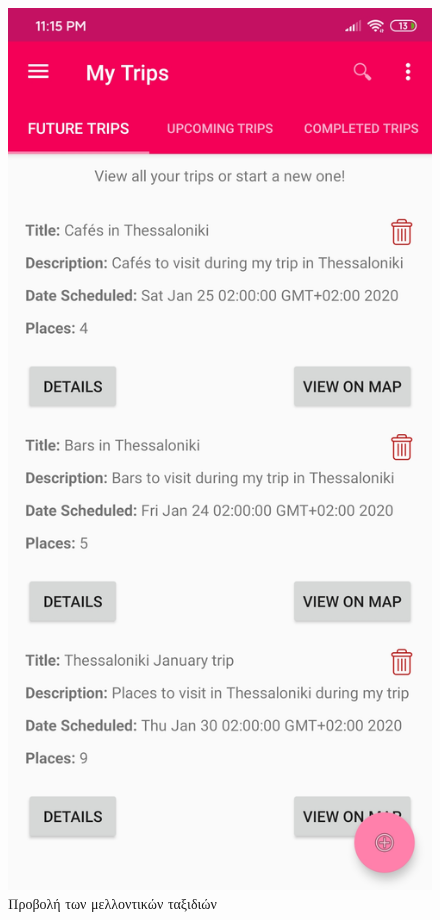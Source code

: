 \documentclass[oneside, 12pt]{book}
\begin{document}
\begin{figure}[h]
  \centering
  \includegraphics[scale=0.15]{images/future_trips.jpg}
  \caption{\label{fig:future_trips}Προβολή των μελλοντικών ταξιδιών}
\end{figure}
\end{document}
